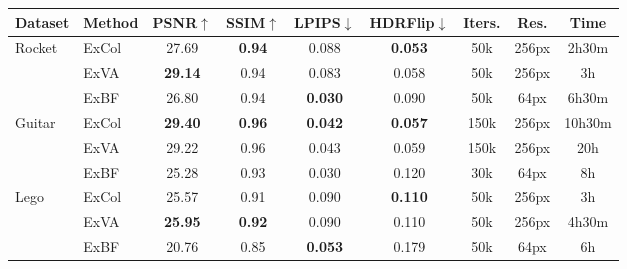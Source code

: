 \begingroup
\begin{table*}[!htb]
    \centering
    \begin{tabular*}{\textwidth}{ l | l | c c c c | c c c }
        Dataset & Method & PSNR$\uparrow$ & SSIM$\uparrow$ & LPIPS$\downarrow$ & HDRFlip$\downarrow$ & Iters. & Res. & Time \\
        \midrule
        
        \multirow{3}{*}{Rocket}
        & ExCol & 27.69 & \textbf{0.94} & 0.088 & \textbf{0.053} & 50k & 256px & 2h30m \\
        & ExVA & \textbf{29.14} & 0.94 & 0.083 & 0.058 & 50k & 256px & 3h \\
        & ExBF & 26.80 & 0.94 & \textbf{0.030} & 0.090 & 50k & 64px & 6h30m \\
        \midrule
        
        \multirow{3}{*}{Guitar}
        & ExCol & \textbf{29.40} & \textbf{0.96} & \textbf{0.042} & \textbf{0.057} & 150k & 256px & 10h30m \\
        & ExVA & 29.22 & 0.96 & 0.043 & 0.059 & 150k & 256px & 20h \\
        & \color{gray}ExBF & \color{gray}25.28 & \color{gray}0.93 & \color{gray}0.030 & \color{gray}0.120 & \color{gray}30k & \color{gray}64px & \color{gray}8h \\
        \midrule
        
        \multirow{3}{*}{Lego}
        & ExCol & 25.57 & 0.91 & 0.090 & \textbf{0.110} & 50k & 256px & 3h \\
        & ExVA & \textbf{25.95} & \textbf{0.92} & 0.090 & 0.110 & 50k & 256px & 4h30m \\
        & ExBF & 20.76 & 0.85 & \textbf{0.053} & 0.179 & 50k & 64px & 6h \\
        \midrule
        

\end{tabular*}
\end{table*}
